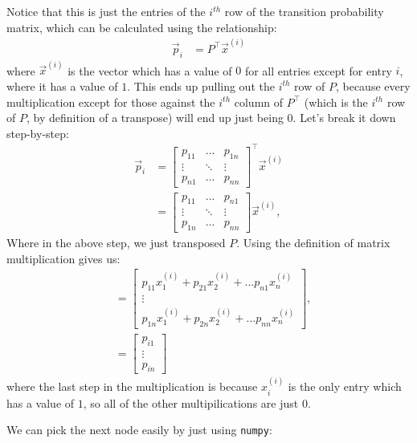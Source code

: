 Notice that this is just the entries of the $i^{th}$ row of the transition probability matrix, which can be calculated using the relationship:
\begin{align*}
    \vec p_i &= P^\top \vec x^{(i)}
\end{align*}
where $\vec x^{(i)}$ is the vector which has a value of $0$ for all entries except for entry $i$, where it has a value of $1$. This ends up pulling out the $i^{th}$ row of $P$, because every multiplication except for those against the $i^{th}$ column of $P^\top$ (which is the $i^{th}$ row of $P$, by definition of a transpose) will end up just being $0$. Let's break it down step-by-step:
\begin{align*}
    \vec p_i &= \begin{bmatrix}
    p_{11} & ... & p_{1n} \\
    \vdots & \ddots & \vdots \\
    p_{n1} & ... & p_{nn}
    \end{bmatrix}^\top\vec x^{(i)} \\
     &= \begin{bmatrix}
    p_{11} & ... & p_{n1} \\
    \vdots & \ddots & \vdots \\
    p_{1n} & ... & p_{nn}
    \end{bmatrix}\vec x^{(i)},
\end{align*}
Where in the above step, we just transposed $P$. Using the definition of matrix multiplication gives us:
\begin{align*}
    &= \begin{bmatrix}
        p_{11}x_{1}^{(i)} + p_{21} x_2^{(i)} + ... p_{n1}x_n^{(i)} \\
        \vdots \\
        p_{1n}x_{1}^{(i)} + p_{2n} x_2^{(i)} + ... p_{nn}x_n^{(i)} 
    \end{bmatrix}, \\
    &= \begin{bmatrix}
        p_{i1} \\
        \vdots \\
        p_{in}
    \end{bmatrix}
\end{align*}
where the last step in the multiplication is because $x_{i}^{(i)}$ is the only entry which has a value of $1$, so all of the other multipilications are just $0$. 

We can pick the next node easily by just using \texttt{numpy}:

